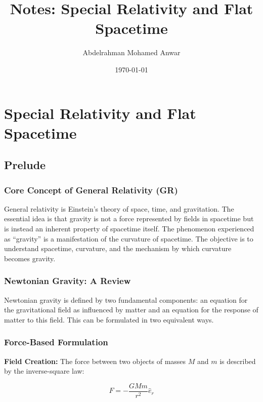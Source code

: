 \documentclass[11pt, a4paper]{report}
\title{Notes: Special Relativity and Flat Spacetime}
\author{Abdelrahman Mohamed Anwar}
\date{\today}
\begin{document}
\maketitle
\thispagestyle{empty}
\newpage

\tableofcontents
\newpage


\chapter{Special Relativity and Flat Spacetime}

\section{Prelude}

\subsection*{Core Concept of General Relativity (GR)}

General relativity is Einstein's theory of space, time, and gravitation. The essential idea is that gravity is not a force represented by fields in spacetime but is instead an inherent property of spacetime itself. The phenomenon experienced as ``gravity'' is a manifestation of the curvature of spacetime. The objective is to understand spacetime, curvature, and the mechanism by which curvature becomes gravity.

\subsection*{Newtonian Gravity: A Review}

Newtonian gravity is defined by two fundamental components: an equation for the gravitational field as influenced by matter and an equation for the response of matter to this field. 
This can be formulated in two equivalent ways.
\subsection*{Force-Based Formulation}

\textbf{Field Creation:} The force between two objects of masses $M$ and $m$ is described by the inverse-square law:

\begin{equation}\label{eq:newton-force}
    F = - \frac{GMm}{r^2} \hat{e}_r
\end{equation}
\end{document}
